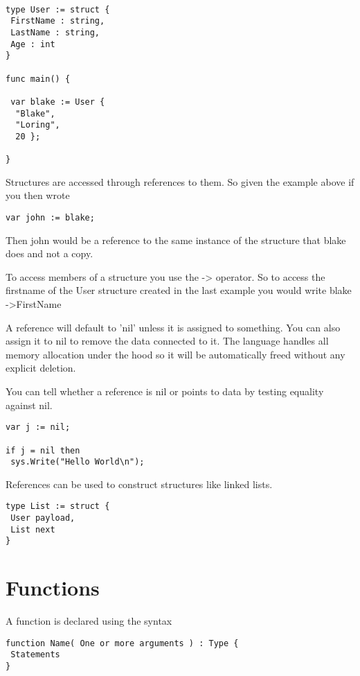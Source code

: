 \documentclass[]{final_report}
\begin{document}
\begin{verbatim}

type User := struct {
 FirstName : string,
 LastName : string,
 Age : int
}

func main() {
 
 var blake := User {
  "Blake",
  "Loring", 
  20 };

}
\end{verbatim}

Structures are accessed through references to them. So given the example above if you then wrote

\begin{verbatim}
var john := blake;
\end{verbatim}

Then john would be a reference to the same instance of the structure that blake does and not a copy. 

To access members of a structure you use the -\textgreater \vspace{1pt} operator. So to access the firstname of the User structure created in the last example you would write blake -\textgreater FirstName 

A reference will default to 'nil' unless it is assigned to something. You can also assign it to nil to remove the data connected to it. The language handles all memory allocation under the hood so it will be automatically freed without any explicit deletion.

You can tell whether a reference is nil or points to data by testing equality against nil.

\begin{verbatim}
var j := nil; 

if j = nil then 
 sys.Write("Hello World\n");
\end{verbatim}

References can be used to construct structures like linked lists.

\begin{verbatim}
type List := struct {
 User payload,
 List next
}
\end{verbatim}


\section{Functions}

A function is declared using the syntax

\begin{verbatim}
function Name( One or more arguments ) : Type {
 Statements
}
\end{verbatim}
\end{document}
